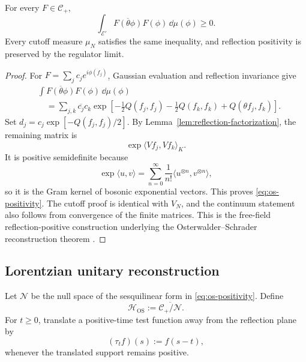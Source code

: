 \begin{theorem}
\label{thm:os-positivity}
For every $F\in\mathcal C_+$,
\begin{equation}
\int_{\mathscr E'}
\overline{F(\theta\phi)}F(\phi)\,\dd\mu(\phi)
\ge0.
\label{eq:os-positivity}
\end{equation}
Every cutoff measure $\mu_N$ satisfies the same inequality, and reflection positivity is preserved by the regulator limit.
\end{theorem}

\begin{proof}
For $F=\sum_jc_je^{i\phi(f_j)}$, Gaussian evaluation and reflection invariance give
\begin{align*}
&\int\overline{F(\theta\phi)}F(\phi)\,\dd\mu(\phi)\\
&\quad=\sum_{j,k}\overline{c_j}c_k
\exp\!\left[-\frac12Q(f_j,f_j)-\frac12Q(f_k,f_k)
+Q(\theta f_j,f_k)\right].
\end{align*}
Set $d_j=c_j\exp[-Q(f_j,f_j)/2]$.  By Lemma~\ref{lem:reflection-factorization}, the remaining matrix is
\[
\exp\langle Vf_j,Vf_k\rangle_K.
\]
It is positive semidefinite because
\[
\exp\langle u,v\rangle
=\sum_{n=0}^\infty\frac1{n!}
\langle u^{\otimes n},v^{\otimes n}\rangle,
\]
so it is the Gram kernel of bosonic exponential vectors.  This proves \eqref{eq:os-positivity}.  The cutoff proof is identical with $V_N$, and the continuum statement also follows from convergence of the finite matrices.  This is the free-field reflection-positive construction underlying the Osterwalder--Schrader reconstruction theorem \cite{OS1973,OS1975}.
\end{proof}

\subsection{Lorentzian unitary reconstruction}

Let $\mathcal N$ be the null space of the sesquilinear form in \eqref{eq:os-positivity}.  Define
\[
\mathcal H_{\mathrm{OS}}
:=\overline{\mathcal C_+/\mathcal N}.
\]
For $t\ge0$, translate a positive-time test function away from the reflection plane by
\[
(\tau_tf)(s):=f(s-t),
\]
whenever the translated support remains positive.


